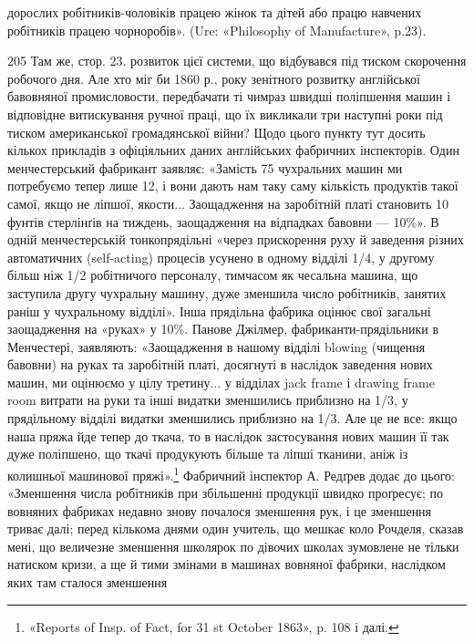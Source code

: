дорослих робітників-чоловіків працею жінок та дітей або працю навчених
робітників працею чорноробів». (Ure: «Philosophy of Manufacture», p.23).

205 Там же, стор. 23.
розвиток цієї системи, що відбувався під тиском скорочення
робочого дня. Але хто міг би 1860 р., року зенітного розвитку
англійської бавовняної промисловости, передбачати ті чимраз
швидші поліпшення машин і відповідне витискування ручної
праці, що їх викликали три наступні роки під тиском американської
громадянської війни? Щодо цього пункту тут досить кількох
прикладів з офіціяльних даних англійських фабричних інспекторів.
Один менчестерський фабрикант заявляє: «Замість 75 чухральних
машин ми потребуємо тепер лише 12, і вони дають нам
таку саму кількість продуктів такої самої, якщо не ліпшої,
якости... Заощадження на заробітній платі становить 10 фунтів
стерлінґів на тиждень, заощадження на відпадках бавовни — 10\%».
В одній менчестерській тонкопрядільні «через прискорення руху
й заведення різних автоматичних (self-acting) процесів усунено
в одному відділі 1/4, у другому більш ніж 1/2 робітничого персоналу,
тимчасом як чесальна машина, що заступила другу чухральну
машину, дуже зменшила число робітників, занятих раніш у чухральному
відділі». Інша прядільна фабрика оцінює свої загальні заощадження
на «руках» у 10\%. Панове Джілмер, фабриканти-прядільники
в Менчестері, заявляють: «Заощадження в нашому відділі
blowing (чищення бавовни) на руках та заробітній платі, досягнуті
в наслідок заведення нових машин, ми оцінюємо у цілу третину...
у відділах jack frame і drawing frame room витрати на руки та інші
видатки зменшились приблизно на 1/3, у прядільному відділі видатки
зменшились приблизно на 1/3. Але це не все: якщо наша пряжа
йде тепер до ткача, то в наслідок застосування нових машин її
так дуже поліпшено, що ткачі продукують більше та ліпші тканини,
аніж із колишньої машинової пряжі».\footnote{
«Reports of Insp. of Fact, for 31 st October 1863», p. 108 і далі.
} Фабричний інспектор
А. Редґрев додає до цього: «Зменшення числа робітників
при збільшенні продукції швидко проґресує; по вовняних фабриках
недавно знову почалося зменшення рук, і це зменшення триває
далі; перед кількома днями один учитель, що мешкає коло Рочделя,
сказав мені, що величезне зменшення школярок по дівочих школах
зумовлене не тільки натиском кризи, а ще й тими змінами
в машинах вовняної фабрики, наслідком яких там сталося зменшення
